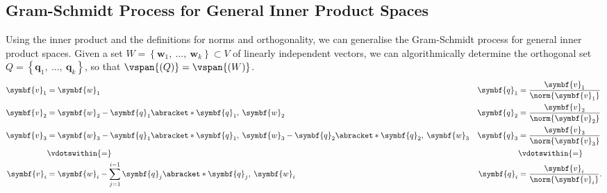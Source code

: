 \documentclass{article}
\begin{document}
\subsection{Gram-Schmidt Process for General Inner Product Spaces}
Using the inner product and the definitions for norms and
orthogonality, we can generalise the Gram-Schmidt process for general
inner product spaces.
Given a set \(W = \left\{ \symbf{w}_1,\: \dots,\: \symbf{w}_k \right\}
\subset V\) of linearly independent vectors, we can algorithmically
determine the orthogonal set \(Q = \left\{ \symbf{q}_1,\: \dots,\:
\symbf{q}_k \right\}\), so that \(\vspan{\left( Q \right)} =
\vspan{\left( W \right)}\).
\begin{align*}
    \symbf{v}_1 & = \symbf{w}_1                                                                                                          & \symbf{q}_1 & = \frac{\symbf{v}_1}{\norm{\symbf{v}_1}}  \\
    \symbf{v}_2 & = \symbf{w}_2 - \symbf{q}_1 \abracket*{\symbf{q}_1,\: \symbf{w}_2}                                                     & \symbf{q}_2 & = \frac{\symbf{v}_2}{\norm{\symbf{v}_2}}  \\
    \symbf{v}_3 & = \symbf{w}_3 - \symbf{q}_1 \abracket*{\symbf{q}_1,\: \symbf{w}_3}- \symbf{q}_2 \abracket*{\symbf{q}_2,\: \symbf{w}_3} & \symbf{q}_3 & = \frac{\symbf{v}_3}{\norm{\symbf{v}_3}}  \\
                & \vdotswithin{=}                                                                                                        &             & \vdotswithin{=}                           \\
    \symbf{v}_i & = \symbf{w}_i - \sum_{j = 1}^{i - 1} \symbf{q}_j \abracket*{\symbf{q}_j,\: \symbf{w}_i}                                & \symbf{q}_i & = \frac{\symbf{v}_i}{\norm{\symbf{v}_i}}.
\end{align*}
\end{document}
